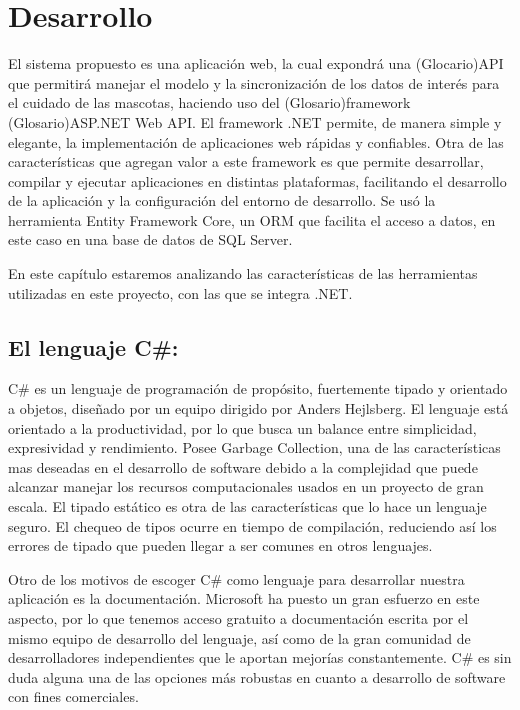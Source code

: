 \chapter{Desarrollo}\label{chapter:implementation}

El sistema propuesto es una aplicación web, la cual expondrá una (Glocario)API que permitirá manejar el modelo y la sincronización de los datos de interés para el cuidado de las mascotas, haciendo uso del (Glosario)framework (Glosario)ASP.NET Web API. El framework .NET permite, de manera simple y elegante, la implementación de aplicaciones web rápidas y confiables. Otra de las características que agregan valor a este framework es que permite desarrollar, compilar y ejecutar aplicaciones en distintas plataformas, facilitando el desarrollo de la aplicación y la configuración del entorno de desarrollo. Se usó la herramienta Entity Framework Core, un ORM que facilita el acceso a datos, en este caso en una base de datos de SQL Server.
\newline

En este capítulo estaremos analizando las características de las herramientas utilizadas en este proyecto, con las que se integra .NET.

\section{El lenguaje C\#:}

C\# es un lenguaje de programación de propósito, fuertemente tipado y orientado a objetos, diseñado por un equipo dirigido por Anders Hejlsberg. El lenguaje está orientado a la productividad, por lo que busca un balance entre simplicidad, expresividad y rendimiento. Posee Garbage Collection, una de las características mas deseadas en el desarrollo de software debido a la complejidad que puede alcanzar manejar los recursos computacionales usados en un proyecto de gran escala. El tipado estático es otra de las características que lo hace un lenguaje seguro. El chequeo de tipos ocurre en tiempo de compilación, reduciendo así los errores de tipado que pueden llegar a ser comunes en otros lenguajes.
\newline

Otro de los motivos de escoger C\# como lenguaje para desarrollar nuestra aplicación es la documentación. Microsoft ha puesto un gran esfuerzo en este aspecto, por lo que tenemos acceso gratuito a documentación escrita por el mismo equipo de desarrollo del lenguaje, así como de la gran comunidad de desarrolladores independientes que le aportan mejorías constantemente. C\# es sin duda alguna una de las opciones más robustas en cuanto a desarrollo de software con fines comerciales.

